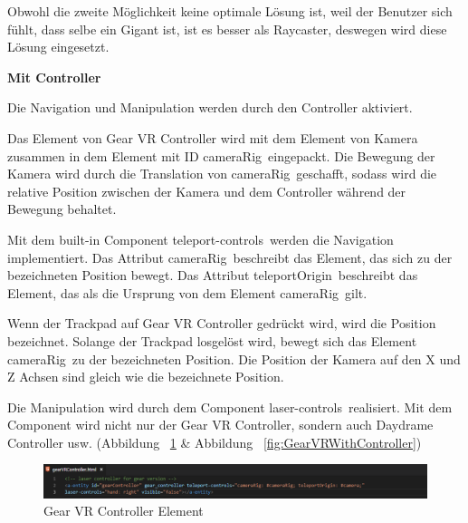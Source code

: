   Obwohl die zweite Möglichkeit keine optimale Lösung ist, weil der Benutzer sich fühlt, dass selbe ein Gigant ist, ist es besser als Raycaster, deswegen wird diese Lösung eingesetzt. 
  
  \textbf{Mit Controller}
  
  Die Navigation und Manipulation werden durch den Controller aktiviert.
  
  Das Element von Gear VR Controller wird mit dem Element von Kamera zusammen in dem Element mit ID \glqq cameraRig\grqq\ eingepackt. Die Bewegung der Kamera wird durch die Translation von \glqq cameraRig\grqq\ geschafft, sodass wird die relative Position zwischen der Kamera und dem Controller während der Bewegung behaltet.
  
  Mit dem built-in Component \glqq teleport-controls\grqq\ werden die Navigation implementiert. Das Attribut \glqq cameraRig\grqq\ beschreibt das Element, das sich zu der bezeichneten Position bewegt. Das Attribut \glqq teleportOrigin\grqq\ beschreibt das Element, das als die Ursprung von dem Element \glqq cameraRig\grqq\ gilt.
  
  Wenn der Trackpad auf Gear VR Controller gedrückt wird, wird die Position bezeichnet. Solange der Trackpad losgelöst wird, bewegt sich das Element \glqq cameraRig\grqq\ zu der bezeichneten Position. Die Position der Kamera auf den X und Z Achsen sind gleich wie die bezeichnete Position.
  
  Die Manipulation wird durch dem Component \glqq laser-controls\grqq\ realisiert. Mit dem Component wird nicht nur der Gear VR Controller, sondern auch Daydrame Controller usw. (Abbildung ~\ref{fig:GearVRControllerElement} \& Abbildung ~\ref{fig:GearVRWithController})
  
\begin{figure}[ht]
\vspace*{0.3cm}
\centering
\includegraphics[width=\textwidth]{images/gearVRControllerElement.png}
\caption[Gear VR Controller Element]{Gear VR Controller Element}
\label{fig:GearVRControllerElement} 
\end{figure}
  
